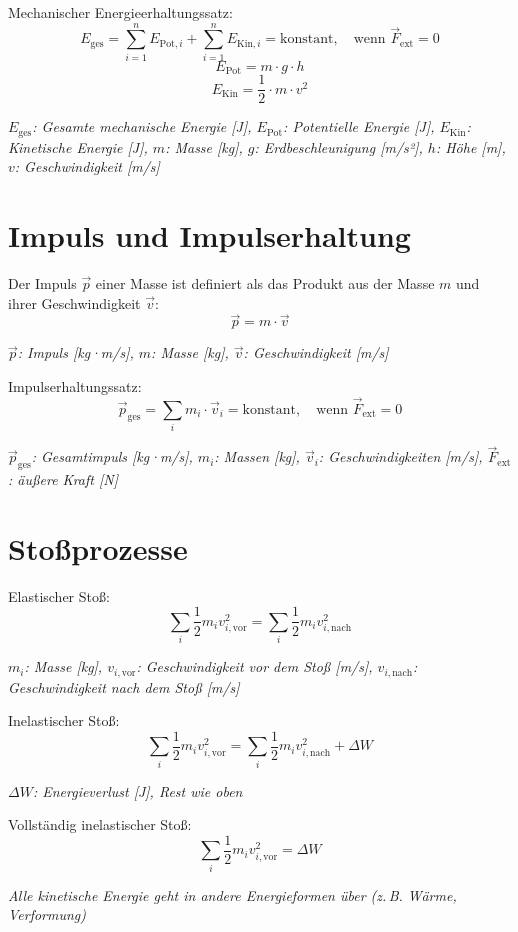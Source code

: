 \documentclass[a4paper,10pt]{article}
\newenvironment{displayformula}
{
	\begin{framed}
		\color{formulaColor}
	}
	{\end{framed}}
\newcommand{\formulalegend}[1]{%
	\par\vspace{0.5ex}%
	{{\color{legendColor}\RaggedRight\small\textit{#1}}}%
	\par\vspace{1.5ex}%
}
\begin{document}
\begin{displayformula}
	Mechanischer Energieerhaltungssatz:
	\[
	E_{\text{ges}} = \sum_{i=1}^{n} E_{\text{Pot}, i} + \sum_{i=1}^{n} E_{\text{Kin}, i} = \text{konstant}, \quad \text{wenn } \vec{F}_{\text{ext}} = 0
	\]
	\[
	E_{\text{Pot}} = m \cdot g \cdot h
	\]
	\[
	E_{\text{Kin}} = \frac{1}{2} \cdot m \cdot v^2
	\]
\end{displayformula}
\formulalegend{
	\( E_{\text{ges}} \): Gesamte mechanische Energie [J], \( E_{\text{Pot}} \): Potentielle Energie [J], \( E_{\text{Kin}} \): Kinetische Energie [J], \( m \): Masse [kg], \( g \): Erdbeschleunigung [m/s²], \( h \): Höhe [m], \( v \): Geschwindigkeit [m/s]
}

\section{Impuls und Impulserhaltung}

\begin{displayformula}
	Der Impuls \( \vec{p} \) einer Masse ist definiert als das Produkt aus der Masse \( m \) und ihrer Geschwindigkeit \( \vec{v} \):
	\[
	\vec{p} = m \cdot \vec{v}
	\]
\end{displayformula}
\formulalegend{
	\( \vec{p} \): Impuls [kg·m/s], \( m \): Masse [kg], \( \vec{v} \): Geschwindigkeit [m/s]
}

\begin{displayformula}
	Impulserhaltungssatz:
	\[
	\vec{p}_{\text{ges}} = \sum_i m_i \cdot \vec{v}_i = \text{konstant}, \quad \text{wenn } \vec{F}_{\text{ext}} = 0
	\]
\end{displayformula}
\formulalegend{
	\( \vec{p}_{\text{ges}} \): Gesamtimpuls [kg·m/s], \( m_i \): Massen [kg], \( \vec{v}_i \): Geschwindigkeiten [m/s], \( \vec{F}_{\text{ext}} \): äußere Kraft [N]
}

\section{Stoßprozesse}

\begin{displayformula}
	Elastischer Stoß:
	\[
	\sum_i \frac{1}{2} m_i v_{i,\text{vor}}^2 = \sum_i \frac{1}{2} m_i v_{i,\text{nach}}^2
	\]
\end{displayformula}
\formulalegend{
	\( m_i \): Masse [kg], \( v_{i,\text{vor}} \): Geschwindigkeit vor dem Stoß [m/s], \( v_{i,\text{nach}} \): Geschwindigkeit nach dem Stoß [m/s]
}

\begin{displayformula}
	Inelastischer Stoß:
	\[
	\sum_i \frac{1}{2} m_i v_{i,\text{vor}}^2 = \sum_i \frac{1}{2} m_i v_{i,\text{nach}}^2 + \Delta W
	\]
\end{displayformula}
\formulalegend{
	\( \Delta W \): Energieverlust [J], Rest wie oben
}
\begin{displayformula}
	Vollständig inelastischer Stoß:
	\[
	\sum_i \frac{1}{2} m_i v_{i,\text{vor}}^2 = \Delta W
	\]
\end{displayformula}
\formulalegend{
	Alle kinetische Energie geht in andere Energieformen über (z.\,B. Wärme, Verformung)
}
\end{document}
